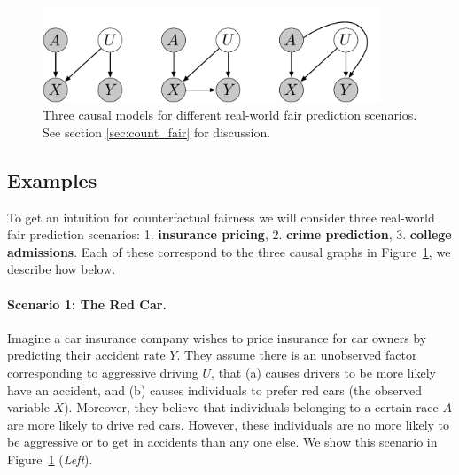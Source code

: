 
\begin{figure}[th]
\begin{center}
\vspace{-2ex}
\centerline{\includegraphics[width=0.9\textwidth]{simple_models_no_q2}}
\vspace{-2ex}
\caption{Three causal models for different real-world fair prediction scenarios.\label{figure.simple_models} See section \ref{sec:count_fair} for discussion.}
\vspace{-2ex}
\end{center}
\end{figure}

\subsection{Examples}
To get an intuition for counterfactual fairness we will consider three real-world fair prediction scenarios: 1. \textbf{insurance pricing}, 2. \textbf{crime prediction}, 3. \textbf{college admissions}. Each of these correspond to the three causal graphs in Figure~\ref{figure.simple_models}, we describe how below.

\paragraph{Scenario 1: The Red Car.}
Imagine a car insurance company wishes to price insurance for car owners by
predicting their accident rate $Y$. They assume there is an
unobserved factor corresponding to aggressive driving $U$, that (a) causes
drivers to be more likely have an accident, and (b) causes individuals to prefer red cars (the observed
variable $X$). Moreover, they believe that individuals belonging to a
certain race $A$ are more likely to drive red cars. However, these individuals are no more likely to be aggressive or to get in accidents than any one else. We show this scenario in Figure~\ref{figure.simple_models} (\emph{Left}).

